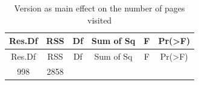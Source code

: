 \documentclass[]{article}
\begin{document}
\begin{longtable}[]{@{}cccccc@{}}
\caption{Version as main effect on the number of pages
visited}\tabularnewline
\toprule
\begin{minipage}[b]{0.10\columnwidth}\centering\strut
Res.Df\strut
\end{minipage} & \begin{minipage}[b]{0.08\columnwidth}\centering\strut
RSS\strut
\end{minipage} & \begin{minipage}[b]{0.06\columnwidth}\centering\strut
Df\strut
\end{minipage} & \begin{minipage}[b]{0.14\columnwidth}\centering\strut
Sum of Sq\strut
\end{minipage} & \begin{minipage}[b]{0.08\columnwidth}\centering\strut
F\strut
\end{minipage} & \begin{minipage}[b]{0.12\columnwidth}\centering\strut
Pr(\textgreater{}F)\strut
\end{minipage}\tabularnewline
\midrule
\endfirsthead
\toprule
\begin{minipage}[b]{0.10\columnwidth}\centering\strut
Res.Df\strut
\end{minipage} & \begin{minipage}[b]{0.08\columnwidth}\centering\strut
RSS\strut
\end{minipage} & \begin{minipage}[b]{0.06\columnwidth}\centering\strut
Df\strut
\end{minipage} & \begin{minipage}[b]{0.14\columnwidth}\centering\strut
Sum of Sq\strut
\end{minipage} & \begin{minipage}[b]{0.08\columnwidth}\centering\strut
F\strut
\end{minipage} & \begin{minipage}[b]{0.12\columnwidth}\centering\strut
Pr(\textgreater{}F)\strut
\end{minipage}\tabularnewline
\midrule
\endhead
\begin{minipage}[t]{0.10\columnwidth}\centering\strut
998\strut
\end{minipage} & \begin{minipage}[t]{0.08\columnwidth}\centering\strut
2858\strut
\end{minipage} & \begin{minipage}[t]{0.06\columnwidth}\centering\strut

\end{minipage}
\end{longtable}
\end{document}
